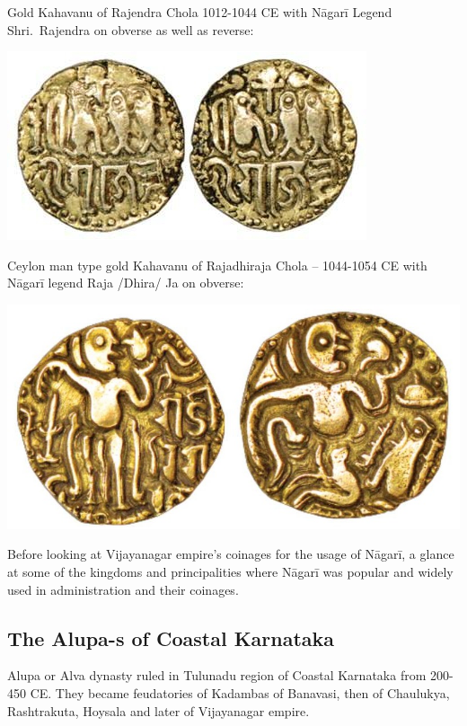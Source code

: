 Gold Kahavanu of Rajendra Chola 1012-1044 CE with Nāgarī Legend Shri.\ Rajendra on obverse as well as reverse:

\centerline{\includegraphics[scale=0.45]{"images/article-06/art06-fig13.jpg"}}

Ceylon man type gold Kahavanu of Rajadhiraja Chola – 1044-1054 CE with Nāgarī legend Raja /Dhira/ Ja on obverse:

\centerline{\includegraphics[scale=0.45]{"images/article-06/art06-fig14.jpg"}}

Before looking at Vijayanagar empire’s coinages for the usage of Nāgarī, a glance at some of the kingdoms and principalities where Nāgarī was popular and widely used in administration and their coinages.


\subsection*{The Alupa-s of Coastal Karnataka}

Alupa or Alva dynasty ruled in Tulunadu region of Coastal Karnataka from 200-450 CE. They became feudatories of Kadambas of Banavasi, then of Chaulukya, Rashtrakuta, Hoysala and later of Vijayanagar empire.

